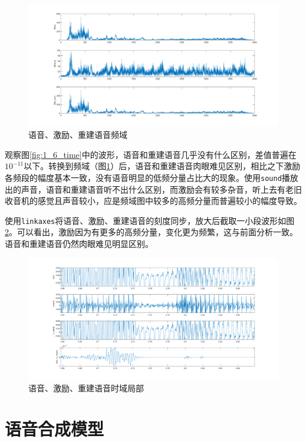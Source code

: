 \documentclass[10pt, a4paper]{article}
\begin{document}
\begin{figure}[h]
    \centering
    \includegraphics[width=.95\textwidth]{../assets/1_6_freq.png}
    \caption{语音、激励、重建语音频域}
    \label{fig:1_6_freq}
\end{figure}

观察图\ref{fig:1_6_time}中的波形，语音和重建语音几乎没有什么区别，差值普遍在$10^{-11}$以下。转换到频域（图\ref{fig:1_6_freq}）后，语音和重建语音肉眼难见区别，相比之下激励各频段的幅度基本一致，没有语音明显的低频分量占比大的现象。使用\texttt{sound}播放出的声音，语音和重建语音听不出什么区别，而激励会有较多杂音，听上去有老旧收音机的感觉且声音较小，应是频域图中较多的高频分量而普遍较小的幅度导致。

使用\texttt{linkaxes}将语音、激励、重建语音的刻度同步，放大后截取一小段波形如图\ref{fig:1_6_time_local}。可以看出，激励因为有更多的高频分量，变化更为频繁，这与前面分析一致。语音和重建语音仍然肉眼难见明显区别。

\begin{figure}[h]
    \centering
    \includegraphics[width=.95\textwidth]{../assets/1_6_time_local.png}
    \caption{语音、激励、重建语音时域局部}
    \label{fig:1_6_time_local}
\end{figure}

\section{语音合成模型}
\end{document}
